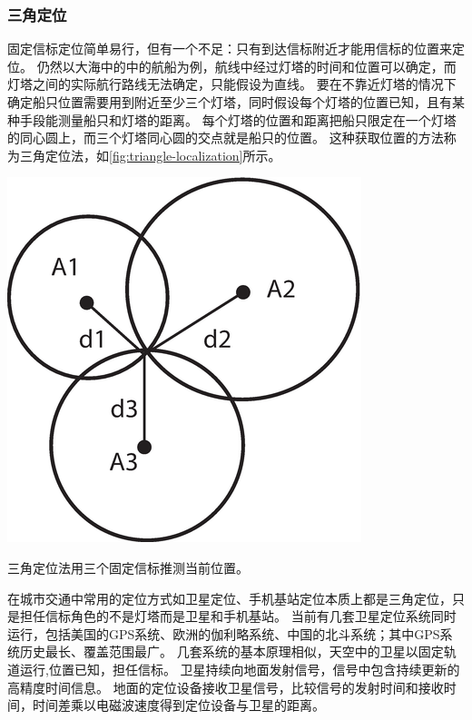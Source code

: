 \subsubsection{三角定位}
固定信标定位简单易行，但有一个不足：只有到达信标附近才能用信标的位置来定位。
仍然以大海中的中的航船为例，航线中经过灯塔的时间和位置可以确定，而灯塔之间的实际航行路线无法确定，只能假设为直线。
要在不靠近灯塔的情况下确定船只位置需要用到附近至少三个灯塔，同时假设每个灯塔的位置已知，且有某种手段能测量船只和灯塔的距离。
每个灯塔的位置和距离把船只限定在一个灯塔的同心圆上，而三个灯塔同心圆的交点就是船只的位置。
这种获取位置的方法称为三角定位法，如\cref{fig:triangle-localization}所示。
\begin{marginfigure}
    \includegraphics[width=\linewidth]{images/triangle-localization.png}
    \caption{三角定位法用三个固定信标推测当前位置。}
    \label{fig:triangle-localization}
\end{marginfigure}

在城市交通中常用的定位方式如卫星定位、手机基站定位本质上都是三角定位，只是担任信标角色的不是灯塔而是卫星和手机基站。
当前有几套卫星定位系统同时运行，包括美国的GPS系统、欧洲的伽利略系统、中国的北斗系统；其中GPS系统历史最长、覆盖范围最广。
几套系统的基本原理相似，天空中的卫星以固定轨道运行,位置已知，担任信标。
卫星持续向地面发射信号，信号中包含持续更新的高精度时间信息。
地面的定位设备接收卫星信号，比较信号的发射时间和接收时间，时间差乘以电磁波速度得到定位设备与卫星的距离。

